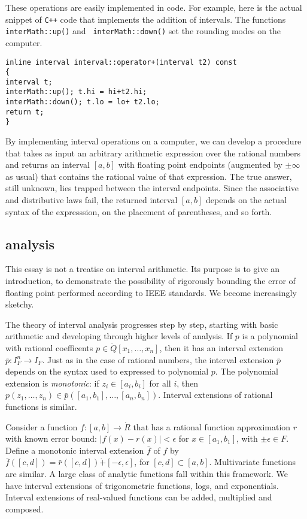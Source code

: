 These operations are easily implemented in code.  For example, here is
the actual snippet of {\tt C++} code that implements the addition of
intervals.  The functions {\tt interMath::up()} and {\tt
  interMath::down()} set the rounding modes on the computer.
\begin{verbatim}
inline interval interval::operator+(interval t2) const
{
interval t;
interMath::up(); t.hi = hi+t2.hi;
interMath::down(); t.lo = lo+ t2.lo;
return t;
}
\end{verbatim}

By implementing interval operations on a computer, we can develop a
procedure that takes as input an arbitrary arithmetic expression over
the rational numbers and returns an interval $[a,b]$ with floating
point endpoints (augmented by $\pm\infty$ as usual) that contains the
rational value of that expression.  The true answer, still unknown,
lies trapped between the interval endpoints.  Since the associative
and distributive laws fail, the returned interval $[a,b]$ depends on
the actual syntax of the expresssion, on the placement of parentheses,
and so forth.



\subsection{analysis}

This essay is not a treatise on interval arithmetic.  Its purpose is
to give an introduction, to demonstrate the possibility of rigorously
bounding the error of floating point performed according to IEEE
standards.  We become increasingly sketchy.

The theory of interval analysis progresses step by step, starting with
basic arithmetic and developing through higher levels of analysis.  If
$p$ is a polynomial with rational coefficents
$p\in\ring{Q}[x_1,\ldots,x_n]$, then it has an interval extension
$\bar p : I_F^n \to I_F$.  Just as in the case of rational numbers,
the interval extension $\bar p$ depends on the syntax used to
expressed to polynomial $p$.  The polynomial extension is {\it
  monotonic}: if $z_i\in [a_i,b_i]$ for all $i$, then
$p(z_1,\ldots,z_n) \in \bar p([a_1,b_1],\ldots,[a_n,b_n])$.  Interval
extensions of rational functions is similar.

Consider a function $f:[a,b]\to\ring{R}$ that
has a rational function approximation $r$ with known
error bound:  $|f(x) - r(x)|<\epsilon$ for $x\in[a_1,b_1]$,
with $\pm\epsilon\in F$.
Define a monotonic interval extension $\bar f$ of $f$ by
$\bar f([c,d]) = \bar r([c,d]) \dot + [-\epsilon,\epsilon]$, for
$[c,d]\subset [a,b]$.  
Multivariate functions are similar.   
%
A large class of analytic functions fall within this framework.
We have interval extensions of trigonometric functions, logs, and
exponentials.  Interval extensions of real-valued functions can be
added, multiplied and composed.  

